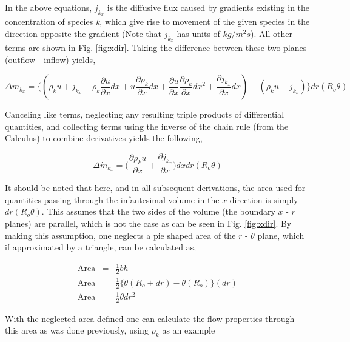 	In the above equations, $j_{k_x}$ is the diffusive flux caused by gradients existing in the concentration
of species \emph{k}, which give rise to movement of the given species in the direction opposite the gradient
(Note that $j_{k_x}$ has units of $kg/m^2 s$). All other terms are shown in Fig. \ref{fig:xdir}.
Taking the difference between these two planes (outflow - inflow) yields,

\begin{displaymath}
	\Delta \dot{m}_{k_x} = \Big\{(\rho_k u + j_{k_x} + \rho_k \frac{\partial u}{\partial x}dx + u \frac{\partial \rho_k}
	{\partial x}dx + \frac{\partial u}{\partial x} \frac{\partial \rho_k}{\partial x}dx^2 + \frac{\partial j_{k_x}}
	{\partial x}dx) - (\rho_k u + j_{k_x})\Big\} dr(R_o \theta)
\end{displaymath}

	Canceling like terms, neglecting any resulting triple products of differential quantities, and collecting terms
using the inverse of the chain rule (from the Calculus) to combine derivatives yields the following,

\begin{displaymath}
	\Delta \dot{m}_{k_x} = \Big( \frac{\partial \rho_k u}{\partial x} + \frac{\partial j_{k_x}}{\partial x}
	\Big)dxdr(R_o \theta)
\end{displaymath}
 
	It should be noted that here, and in all subsequent derivations, the area used for quantities passing through
the infantesimal volume in the $x$ direction is simply $dr(R_o \theta)$.  This assumes that the two sides of
the volume (the boundary $x$ - $r$ planes) are parallel, which is not the case as can be seen in Fig. \ref{fig:xdir}.
By making this assumption, one neglects a pie shaped area of the $r$ - $\theta$ plane, which if approximated by a 
triangle, can be calculated as,

\begin{displaymath}
	\begin{array}{ccc}
		\textrm{Area} & = & \frac{1}{2}bh \\
		\textrm{Area} & = & \frac{1}{2}\Big\{\theta(R_o + dr) - \theta(R_o)\Big\}(dr) \\
		\textrm{Area} & = & \frac{1}{2}\theta dr^2
	\end{array}
\end{displaymath}

	With the neglected area defined one can calculate the flow properties through this area as was done
previously, using $\rho_k$ as an example

